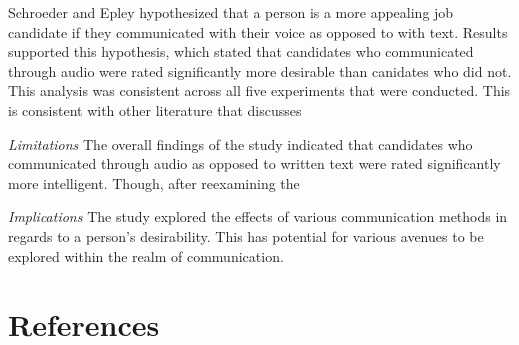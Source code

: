 \documentclass[man]{apa6}
\begin{document}
Schroeder and Epley hypothesized that a person is a more appealing job
candidate if they communicated with their voice as opposed to with text.
Results supported this hypothesis, which stated that candidates who
communicated through audio were rated significantly more desirable than
canidates who did not. This analysis was consistent across all five
experiments that were conducted. This is consistent with other
literature that discusses

\newpage

\emph{Limitations} The overall findings of the study indicated that
candidates who communicated through audio as opposed to written text
were rated significantly more intelligent. Though, after reexamining the

\emph{Implications} The study explored the effects of various
communication methods in regards to a person's desirability. This has
potential for various avenues to be explored within the realm of
communication.

\section{References}\label{references}

\begingroup
\setlength{\parindent}{-0.5in} \setlength{\leftskip}{0.5in}

\hypertarget{refs}{}

\endgroup
\end{document}
